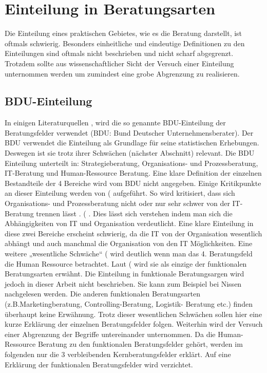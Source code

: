 \section{Einteilung in Beratungsarten}
Die Einteilung eines praktischen Gebietes, wie es die Beratung darstellt, ist oftmals schwierig. Besonders einheitliche und eindeutige Definitionen zu den Einteilungen sind oftmals nicht beschrieben und nicht scharf abgegrenzt. Trotzdem sollte aus wissenschaftlicher Sicht der Versuch einer Einteilung unternommen werden um zumindest eine grobe Abgrenzung zu realisieren.

\subsection{BDU-Einteilung}
In einigen Literaturquellen \cite[54]{Lippold201309},\cite[4]{nissen2007consulting} wird die so genannte BDU-Einteilung der Beratungsfelder verwendet (BDU: Bund Deutscher Unternehmensberater). Der BDU verwendet die Einteilung als Grundlage für seine statistischen Erhebungen. Deswegen ist sie trotz ihrer Schwächen (nächster Abschnitt) relevant.
Die BDU Einteilung unterteilt in: Strategieberatung, Organisations- und Prozessberatung, IT-Beratung und Human-Ressource Beratung. Eine klare Definition der einzelnen Bestandteile der 4 Bereiche wird vom BDU nicht angegeben. Einige Kritikpunkte an dieser Einteilung werden von (\cite[54]{Lippold201309} aufgeführt. So wird kritisiert, \glqq [...] dass sich Organisations- und Prozessberatung nicht oder nur sehr schwer von der IT-Beratung trennen l\"asst \grqq. (\cite[54]{Lippold201309} . Dies lässt sich verstehen indem man sich die Abhängigkeiten von IT und Organisation verdeutlicht. Eine klare Einteilung in diese zwei Bereiche erscheint schwierig, da die IT von der Organisation wesentlich abhängt und auch manchmal die Organisation von den IT Möglichkeiten. Eine weitere „wesentliche Schwäche“ (\cite[54]{Lippold201309}  wird deutlich wenn man das 4. Beratungsfeld die Human Ressource betrachtet. Laut (\cite[54]{Lippold201309} wird sie als einzige der funktionalen Beratungsarten erwähnt. Die Einteilung in funktionale Beratungsargen wird jedoch in dieser Arbeit nicht beschrieben. Sie kann zum Beispiel bei Nissen nachgelesen werden. Die anderen funktionalen Beratungsarten (z.B.Marketingberatung, Controlling-Beratung, Logistik- Beratung etc.) finden überhaupt keine Erwähnung.
Trotz dieser wesentlichen Schwächen sollen hier eine kurze Erklärung der einzelnen Beratungsfelder folgen. Weiterhin wird der Versuch einer Abgrenzung der Begriffe untereinander unternommen. Da die Human-Ressource Beratung zu den funktionalen Beratungsfelder gehört, werden im folgenden nur die 3 verbleibenden Kernberatungsfelder erklärt. Auf eine Erklärung der funktionalen Beratungsfelder wird verzichtet. 

